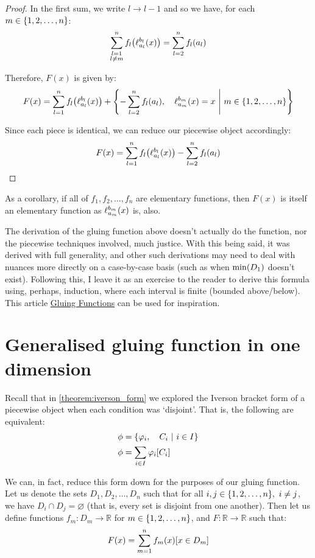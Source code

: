 \begin{proof}
    In the first sum, we write $l\to l-1$ and so we have, for each $m\in\{1,2,\dots,n\}$:
    $$
        \sum_{\substack{l=1\\l\neq m}}^{n}{f_l\paren*{\ell_{a_l}^{b_l}\paren{x}}} = \sum_{l=2}^{n}{f_{l}\paren*{a_{l}}}
    $$

    Therefore, $F(x)$ is given by:
    $$
        F(x) = \sum_{l=1}^{n}{f_l\paren*{\ell_{a_l}^{b_l}\paren{x}}}+\pwobj{-\sum_{l=2}^{n}{f_{l}\paren*{a_{l}}}}{\ell_{a_m}^{b_m}\paren{x}=x}{m\in\br{1,2,\dots,n}}
    $$

    Since each piece is identical, we can reduce our piecewise object accordingly:
    $$
        F(x) = \sum_{l=1}^{n}{f_l\paren*{\ell_{a_l}^{b_l}\paren{x}}}-\sum_{l=2}^{n}{f_{l}\paren*{a_{l}}}
    $$
\end{proof}

As a corollary, if all of $f_1,f_2,\dots,f_n$ are elementary functions, then $F(x)$ is itself an elementary function as $\ell_{a_m}^{b_m}(x)$ is, also.

The derivation of the gluing function above doesn't actually do the function, nor the piecewise techniques involved, much justice. With this being said, it was derived with full generality, and other such derivations may need to deal with nuances more directly on a case-by-case basis (such as when $\min(D_1)$ doesn't exist). Following this, I leave it as an exercise to the reader to derive this formula using, perhaps, induction, where each interval is finite (bounded above/below). This article \href{https://piecewise.org/exploration/gluing-functions}{Gluing Functions} can be used for inspiration.

\section{Generalised gluing function in one dimension}
Recall that in \autoref{theorem:iverson_form} we explored the Iverson bracket form of a piecewise object when each condition was `disjoint'. That is, the following are equivalent:
\begin{align*}
    \phi &= \left\{\varphi_i,\quad C_i\ \middle|\ i\in I\right\} \\
    \phi &= \sum_{i\in I}{\varphi_i[C_i]}
\end{align*}

We can, in fact, reduce this form down for the purposes of our gluing function. Let us denote the sets $D_1,D_2,\dots,D_n$ such that for all $i,j\in\br{1,2,\dots,n},\ i\neq j$, we have $D_i\cap D_j=\varnothing$ (that is, every set is disjoint from one another). Then let us define functions $f_m:D_m\to\mathbb{R}$ for $m\in\{1,2,\dots,n\}$, and $F:\mathbb{R}\to\mathbb{R}$ such that:
$$
    F(x) = \sum_{m=1}^{n}{f_m(x)[x\in D_m]}
$$

